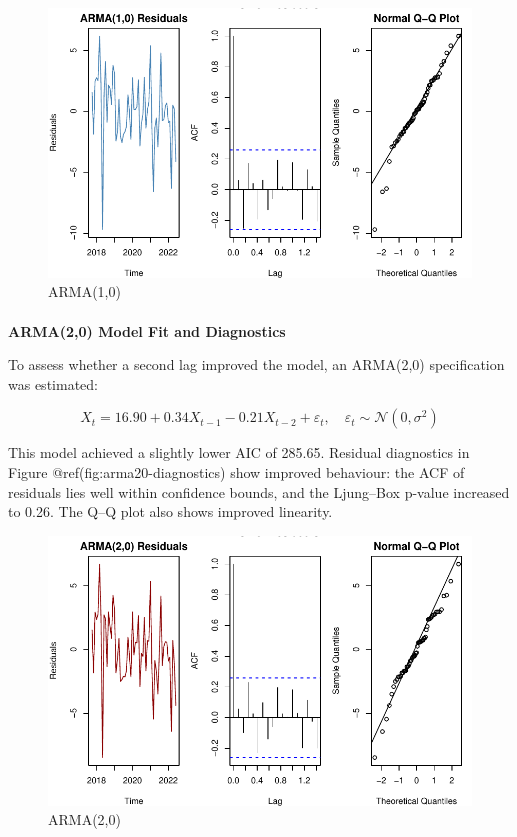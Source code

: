 \documentclass[
  11pt,
]{article}
\makeatletter
\let\oldparagraph\paragraph
\renewcommand{\paragraph}{
    \@ifstar
      \xxxParagraphStar
      \xxxParagraphNoStar
  }
\newcommand{\xxxParagraphStar}[1]{\oldparagraph*{#1}\mbox{}}
\newcommand{\xxxParagraphNoStar}[1]{\oldparagraph{#1}\mbox{}}
\makeatother
\begin{document}
\begin{figure}[H]

{\centering \includegraphics{project_files/figure-pdf/fig-ARMA(1,0)-1.pdf}

}

\caption{ARMA(1,0)}

\end{figure}%

\paragraph{\texorpdfstring{\textbf{ARMA(2,0) Model Fit and
Diagnostics}}{ARMA(2,0) Model Fit and Diagnostics}}\label{arma20-model-fit-and-diagnostics}

To assess whether a second lag improved the model, an ARMA(2,0)
specification was estimated:

\[
X_t = 16.90 + 0.34 X_{t-1} - 0.21 X_{t-2} + \varepsilon_t, \quad \varepsilon_t \sim \mathcal{N}(0, \sigma^2)
\]

This model achieved a slightly lower AIC of 285.65. Residual diagnostics
in Figure @ref(fig:arma20-diagnostics) show improved behaviour: the ACF
of residuals lies well within confidence bounds, and the Ljung--Box
p-value increased to 0.26. The Q--Q plot also shows improved linearity.

\begin{figure}[H]

{\centering \includegraphics{project_files/figure-pdf/fig-ARMA(2,0)-1.pdf}

}

\caption{ARMA(2,0)}

\end{figure}%
\end{document}

